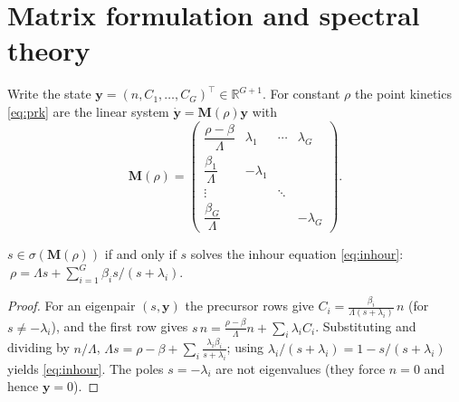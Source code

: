 


\section{Matrix formulation and spectral theory}
\label{sec:pk-matrix}

Write the state $\mathbf y=(n,C_1,\dots,C_G)^{\!\top}\in\mathbb R^{G+1}$. For
constant $\rho$ the point kinetics \eqref{eq:prk} are the linear system
$\dot{\mathbf y}=\mathbf M(\rho)\mathbf y$ with
\begin{equation}
\mathbf M(\rho)=
\begin{pmatrix}
\dfrac{\rho-\beta}{\Lambda} & \lambda_1 & \cdots & \lambda_G\\[5pt]
\dfrac{\beta_1}{\Lambda} & -\lambda_1 & & \\
\vdots & & \ddots & \\
\dfrac{\beta_G}{\Lambda} & & & -\lambda_G
\end{pmatrix}.
\label{eq:M}
\end{equation}

\begin{theorem}
\label{thm:spectrum}
$s\in\sigma(\mathbf M(\rho))$ if and only if $s$ solves the inhour equation
\eqref{eq:inhour}: $\ \rho=\Lambda s+\sum_{i=1}^G \beta_i s/(s+\lambda_i).$
\end{theorem}
\begin{proof}
For an eigenpair $(s,\mathbf y)$ the precursor rows give
$C_i=\frac{\beta_i}{\Lambda(s+\lambda_i)}\,n$ (for $s\ne-\lambda_i$), and the first
row gives $s\,n=\frac{\rho-\beta}{\Lambda}n+\sum_i\lambda_i C_i$. Substituting and
dividing by $n/\Lambda$,
$\Lambda s=\rho-\beta+\sum_i\frac{\lambda_i\beta_i}{s+\lambda_i}$; using
$\lambda_i/(s+\lambda_i)=1-s/(s+\lambda_i)$ yields \eqref{eq:inhour}. The poles
$s=-\lambda_i$ are not eigenvalues (they force $n=0$ and hence $\mathbf y=0$).
\end{proof}

